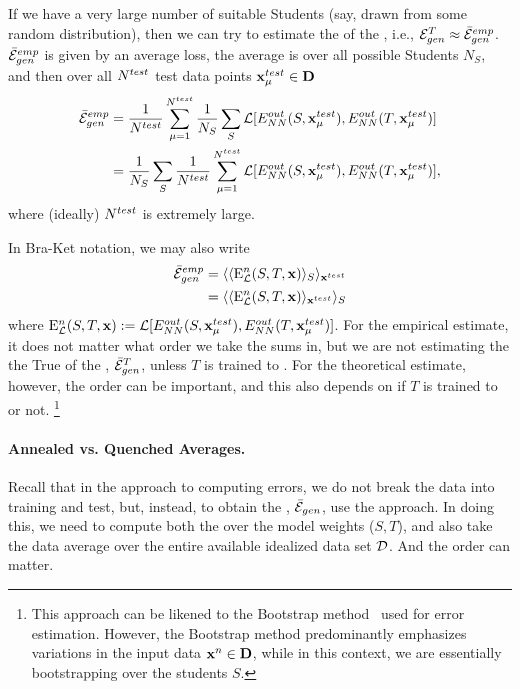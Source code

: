 If we have a very large number of suitable Students
(say, drawn from some random distribution), then we can try to estimate the 
\AverageGeneralizationError of the \Teacher, i.e., ${\mathcal{E}}_{gen}^{T}\approx\bar{\mathcal{E}}^{emp}_{gen}$.
$\bar{\mathcal{E}}^{emp}_{gen}$ is given by an average loss, the average is 
over all possible Students $N_S$,  and then  over all  $N^{test}$ test data points $\mathbf{x}_{\mu}^{test}\in\mathbf{D}$ 
\begin{align}
  \bar{\mathcal{E}}^{emp}_{gen}
  &=
  \frac{1}{N^{test}}\sum_{\mu=1}^{N^{test}}
  \frac{1}{N_S}\sum_{S}
  \mathcal{L}[E^{out}_{NN}(S,\mathbf{x}_{\mu}^{test}),E^{out}_{NN}(T,\mathbf{x}_{\mu}^{test})]  \\ \nonumber
    &=
  \frac{1}{N_S}\sum_{S}
    \frac{1}{N^{test}}\sum_{\mu=1}^{N^{test}}
    \mathcal{L}[E^{out}_{NN}(S,\mathbf{x}_{\mu}^{test}),E^{out}_{NN}(T,\mathbf{x}_{\mu}^{test})] ,
\label{eqn:emp_gen_error}
\end{align}
where (ideally) $N^{test}$ is extremely large.

In Bra-Ket notation, we may also write
\begin{align}
  \bar{\mathcal{E}}^{emp}_{gen}
  &= \langle \langle {\mathrm{E}}^{n}_{\mathcal{L}}(S,T,\mathbf{x}) \rangle_{S} \rangle_{\mathbf{x}^{test}}\\ \nonumber
  &= \langle \langle {\mathrm{E}}^{n}_{\mathcal{L}}(S,T,\mathbf{x}) \rangle_{\mathbf{x}^{test}} \rangle_{S}
\end{align}
where ${\mathrm{E}}^{n}_{\mathcal{L}}(S,T,\mathbf{x}):=\mathcal{L}[E^{out}_{NN}(S,\mathbf{x}_{\mu}^{test}),E^{out}_{NN}(T,\mathbf{x}_{\mu}^{test})]$.
For the empirical estimate, it does not matter what order we take the sums in,
but we are not estimating the
the True \AverageGeneralizationError  of the \Teacher, $\bar{\mathcal{E}}_{gen}^{T}$,
unless $T$ is trained to \Interpolation.
For the theoretical estimate, however, the order can be important, and this also depends on
if $T$ is trained to \Interpolation or not.
\footnote{This approach can be likened to the Bootstrap method~\cite{efron1993bootstrap} used for error estimation.  However, the Bootstrap method predominantly emphasizes variations in the input data $\mathbf{x}^{n}\in\mathbf{D}$, while in this context, we are essentially bootstrapping over the students $S$.}

\paragraph{Annealed vs. Quenched Averages.}
Recall that in the \STATMECH approach to computing errors, we do not break the data into
training and test, but, instead, to obtain the \AverageGeneralizationError, $\bar{\mathcal{E}}_{gen}$, use
the \GeneratingFunction approach. In doing this, we need to compute both the \ThermalAverage
over the model weights ($S,T$), and also take the data average over the entire available idealized data set $\mathcal{D}$.
And the order can matter.

